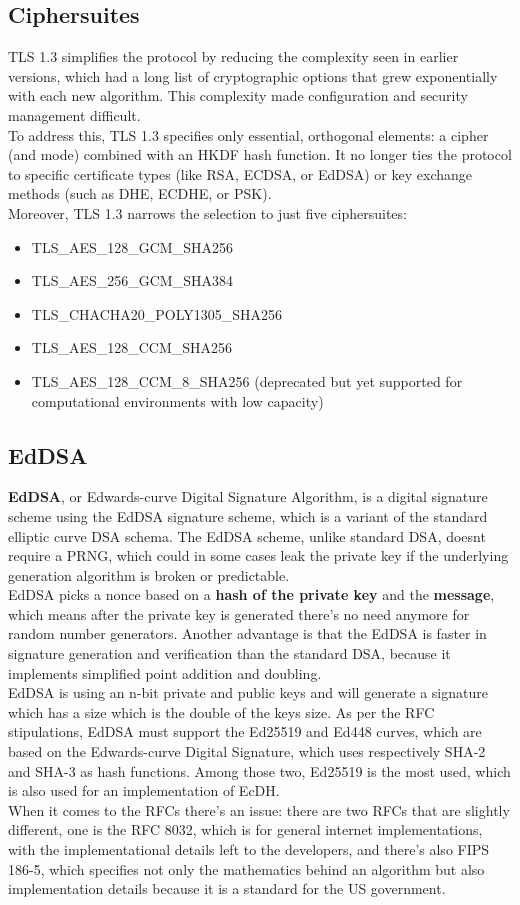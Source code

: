 \subsection{Ciphersuites}
TLS 1.3 simplifies the protocol by reducing the complexity seen in
earlier versions, which had a long list of cryptographic options that
grew exponentially with each new algorithm. This complexity made
configuration and security management difficult.\\
To address this, TLS 1.3 specifies only essential, orthogonal
elements: a cipher (and mode) combined with an HKDF hash function. It
no longer ties the protocol to specific certificate types (like RSA,
ECDSA, or EdDSA) or key exchange methods (such as DHE, ECDHE, or
PSK).\\
Moreover, TLS 1.3 narrows the selection to just five ciphersuites:
\begin{itemize}
  \item TLS\_AES\_128\_GCM\_SHA256
  \item TLS\_AES\_256\_GCM\_SHA384
  \item TLS\_CHACHA20\_POLY1305\_SHA256
  \item TLS\_AES\_128\_CCM\_SHA256
  \item TLS\_AES\_128\_CCM\_8\_SHA256 (deprecated but yet supported
    for computational environments with low capacity)
\end{itemize}

\subsection{EdDSA}
\textbf{EdDSA}, or Edwards-curve Digital Signature Algorithm, is a digital 
signature scheme using the EdDSA signature scheme, which is a variant
of the standard elliptic curve DSA schema. The EdDSA scheme,
unlike standard DSA, doesnt require a PRNG, which could in some cases
leak the private key if the underlying generation algorithm is broken
or predictable.\\
EdDSA picks a nonce based on a \textbf{hash of the private key} and
the \textbf{message}, which means after the private key is generated
there’s no need anymore for random number generators. Another
advantage is that the EdDSA is faster in signature generation and
verification than the standard DSA, because it implements simplified
point addition and doubling.\\
EdDSA is using an n-bit private and public keys and will generate a
signature which has a size which is the double of the keys size.
As per the RFC stipulations, EdDSA must support the Ed25519 and
Ed448 curves, which are based on the Edwards-curve Digital Signature,
which uses respectively SHA-2 and SHA-3 as hash functions. Among those
two, Ed25519 is the most used, which is also used for an
implementation of EcDH.\\
When it comes to the RFCs there's an issue: there are two RFCs that 
are slightly different, one is the RFC 8032, which is for general
internet implementations, with the implementational details left to
the developers, and there's also FIPS 186-5, which specifies not only
the mathematics behind an algorithm but also implementation details
because it is a standard for the US government.


